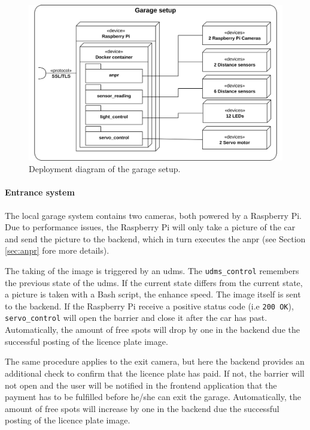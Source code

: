 \begin{figure}[hpt]
    \centering
    \includegraphics[width=12cm]{images/deployment_diagram_raspberry_pi.png}
    \caption{Deployment diagram of the garage setup.}
    \label{fig:deployment-garage-setup}
\end{figure}

\paragraph{Entrance system}\label{sec:entrance-system}
The local garage system contains two cameras, both powered by a Raspberry Pi. Due to performance issues, the Raspberry Pi will only take a picture of the car and send the picture to the backend, which in turn executes the \ac{anpr} (see Section \ref{sec:anpr} fore more details). 

\ind The taking of the image is triggered by an \ac{udms}. The \verb|udms_control| remembers the previous state of the \ac{udms}. If the current state differs from the current state, a picture is taken with a Bash script, the enhance speed. The image itself is sent to the backend. If the Raspberry Pi receive a positive status code (i.e \verb|200 OK|), \verb|servo_control| will open the barrier and close it after the car has past. Automatically, the amount of free spots will drop by one in the backend due the successful posting of the licence plate image.

\ind The same procedure applies to the exit camera, but here the backend provides an additional check to confirm that the licence plate has paid. If not, the barrier will not open and the user will be notified in the frontend application that the payment has to be fulfilled before he/she can exit the garage. Automatically, the amount of free spots will increase by one in the backend due the successful posting of the licence plate image.

